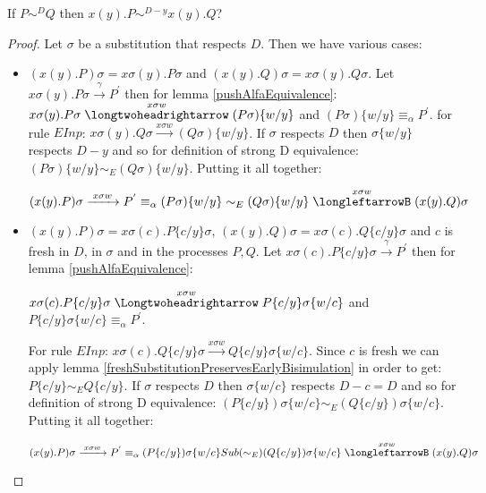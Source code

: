 \begin{lemma}\label{strongDEquivalencePreservedByInput}
  If $P \sim^{D} Q$ then $x(y).P \sim^{D-y} x(y).Q$?
  \begin{proof}
    Let $\sigma$ be a substitution that respects $D$. Then we have various cases:
    \begin{itemize}
      \item 
	$(x(y).P)\sigma = x\sigma(y).P\sigma$ and $(x(y).Q)\sigma = x\sigma(y).Q\sigma$. Let $x\sigma (y).P\sigma \xrightarrow{\gamma} P^{'}$ then for lemma \ref{pushAlfaEquivalence}: $x\sigma (y).P\sigma \stackrel{x\sigma w}{\longtwoheadrightarrow} (P\sigma)\{w/y\}$ and $(P\sigma)\{w/y\} \equiv_{\alpha} P^{'}$. for rule $EInp$: $x\sigma (y).Q\sigma \xrightarrow{x\sigma w} (Q\sigma)\{w/y\}$. If $\sigma$ respects $D$ then $\sigma\{w/y\}$ respects $D-y$ and so for definition of strong D equivalence: $(P\sigma)\{w/y\} \sim_{E} (Q\sigma)\{w/y\}$. Putting it all together:
	\begin{center}
	  $(x(y).P)\sigma \xrightarrow{\; x\sigma w \;} P^{'} \equiv_{\alpha} (P\sigma)\{w/y\} \sim_{E} (Q\sigma)\{w/y\} \stackrel{x\sigma w}{\longleftarrowB} (x(y).Q)\sigma$
	\end{center}
      \item
	$(x(y).P)\sigma = x\sigma(c).P\{c/y\}\sigma$, $(x(y).Q)\sigma = x\sigma(c).Q\{c/y\}\sigma$ and $c$ is fresh in $D$, in $\sigma$ and in the processes $P,Q$. Let $x\sigma(c).P\{c/y\}\sigma \xrightarrow{\gamma} P^{'}$ then for lemma \ref{pushAlfaEquivalence}: 
	\begin{center}
	  $x\sigma(c).P\{c/y\}\sigma \stackrel{x\sigma w}{\Longtwoheadrightarrow} P\{c/y\}\sigma \{w/c\}$ and $P\{c/y\}\sigma \{w/c\}\equiv_{\alpha} P^{'}$. 
	\end{center}
	For rule $EInp$: $x\sigma(c).Q\{c/y\}\sigma \xrightarrow{x\sigma w} Q\{c/y\}\sigma\{w/c\}$. Since $c$ is fresh we can apply lemma \ref{freshSubstitutionPreservesEarlyBisimulation} in order to get: $P\{c/y\} \sim_{E} Q\{c/y\}$. If $\sigma$ respects $D$ then $\sigma\{w/c\}$ respects $D-c=D$ and so for definition of strong D equivalence: $(P\{c/y\})\sigma\{w/c\} \sim_{E} (Q\{c/y\})\sigma\{w/c\}$. Putting it all together:
	\begin{center}
	  $(x(y).P)\sigma \xrightarrow{\; x\sigma w \;} P^{'} \equiv_{\alpha} (P\{c/y\})\sigma \{w/c\} Sub(\sim_{E}) (Q\{c/y\})\sigma\{w/c\} \stackrel{x\sigma w}{\longleftarrowB} (x(y).Q)\sigma$
	\end{center}
    \end{itemize}

  \end{proof}
\end{lemma}



